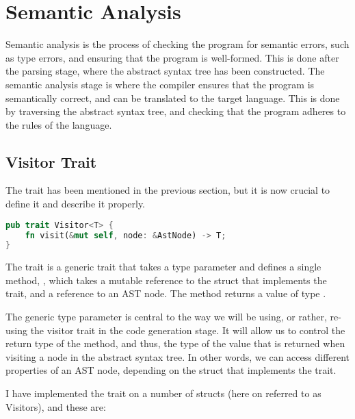 \section{Semantic Analysis}

Semantic analysis is the process of checking the program for semantic errors,
such as type errors, and ensuring that the program is well-formed. This is done
after the parsing stage, where the abstract syntax tree has been constructed.
The semantic analysis stage is where the compiler ensures that the program is
semantically correct, and can be translated to the target language. This is done
by traversing the abstract syntax tree, and checking that the program adheres to
the rules of the language.

\subsection{Visitor Trait}

The  trait has been mentioned in the previous section, but it is
now crucial to define it and describe it properly.

\begin{mainbox}{}
    \lstset{xleftmargin=0.2\textwidth, aboveskip=0pt, belowskip=0pt}
    \begin{lstlisting}[language=Rust]
pub trait Visitor<T> {
    fn visit(&mut self, node: &AstNode) -> T;
}
\end{lstlisting}
\end{mainbox}

The  trait is a generic trait that takes a type parameter 
and defines a single method, , which takes a mutable reference to
the struct that implements the trait, and a reference to an AST node. The method
returns a value of type .

The generic type parameter  is central to the way we will be using, or
rather, re-using the visitor trait in the code generation stage. It will allow
us to control the return type of the  method, and thus, the type of
the value that is returned when visiting a node in the abstract syntax tree. In
other words, we can access different properties of an AST node, depending on the
struct that implements the  trait.

I have implemented the  trait on a number of structs (here on referred to as Visitors), and these are:

